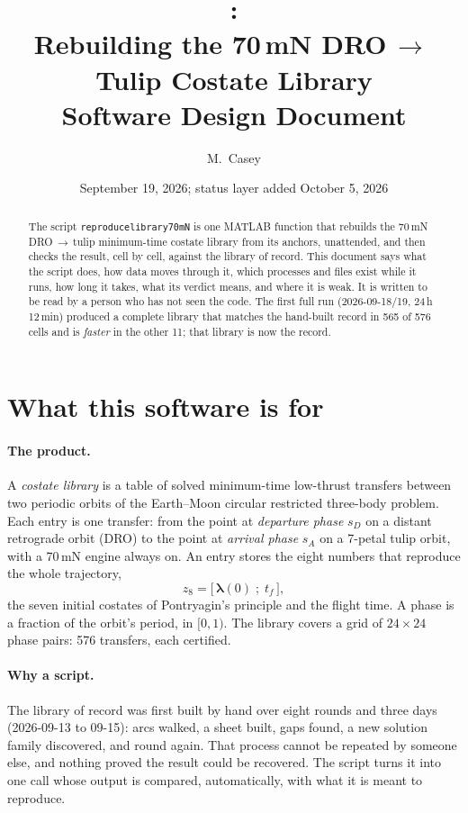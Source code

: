 \documentclass[11pt]{article}
\title{\code{reproduce\_library\_70mN}:\\[2pt] \large Rebuilding the 70\,mN DRO\,$\to$\,Tulip Costate Library\\ Software Design Document}
\author{M.~Casey}
\date{September 19, 2026; status layer added October 5, 2026}
\renewcommand{\_}{\textunderscore\allowbreak}
\newcommand{\code}[1]{\texttt{#1}}
\begin{document}
\maketitle

\begin{abstract}
\noindent\sloppy
The script \code{reproduce\_library\_70mN} is one MATLAB function that rebuilds the
70\,mN DRO\,$\to$\,tulip minimum-time costate library from its anchors,
unattended, and then checks the result, cell by cell, against the library
of record. This document says what the script does, how data moves through
it, which processes and files exist while it runs, how long it takes, what
its verdict means, and where it is weak. It is written to be read by a
person who has not seen the code. The first full run (2026-09-18/19, 24\,h
12\,min) produced a complete library that matches the hand-built record in
565 of 576 cells and is \emph{faster} in the other 11; that library is now
the record.
\end{abstract}

\tableofcontents
\newpage

\section{What this software is for}

\paragraph{The product.} A \emph{costate library} is a table of solved
minimum-time low-thrust transfers between two periodic orbits of the
Earth--Moon circular restricted three-body problem. Each entry is one
transfer: from the point at \emph{departure phase} $s_D$ on a distant
retrograde orbit (DRO) to the point at \emph{arrival phase} $s_A$ on a
7-petal tulip orbit, with a 70\,mN engine always on. An entry stores the
eight numbers that reproduce the whole trajectory,
\[
  z_8=\big[\,\bm\lambda(0)\;;\;t_f\,\big],
\]
the seven initial costates of Pontryagin's principle and the flight time.
A phase is a fraction of the orbit's period, in $[0,1)$. The library covers
a grid of $24\times24$ phase pairs: 576 transfers, each certified.

\paragraph{Why a script.} The library of record was first built by hand
over eight rounds and three days (2026-09-13 to 09-15): arcs walked, a
sheet built, gaps found, a new solution family discovered, and round again.
That process cannot be repeated by someone else, and nothing proved the
result could be recovered. The script turns it into one call whose output
is compared, automatically, with what it is meant to reproduce.
\end{document}
